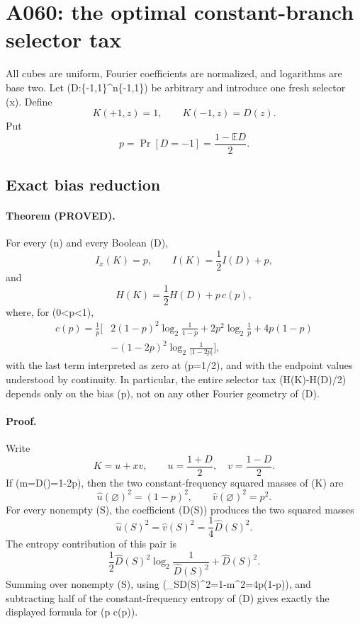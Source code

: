 \section*{A060: the optimal constant-branch selector tax}

All cubes are uniform, Fourier coefficients are normalized, and logarithms
are base two.  Let (D:\{-1,1\}^n\to\{-1,1\}) be arbitrary and introduce
one fresh selector (x).  Define
\[
 K(+1,z)=1,\qquad K(-1,z)=D(z).
\]
Put
\[
 p=\Pr[D=-1]=\frac{1-\mathbb ED}{2}.
\]

\subsection*{Exact bias reduction}

\paragraph{Theorem (PROVED).}
For every (n) and every Boolean (D),
\[
 I_x(K)=p,\qquad I(K)=\frac12I(D)+p,
\]
and
\[
 H(K)=\frac12H(D)+p\,c(p),
\]
where, for (0<p<1),
\begin{align*}
 c(p)=\frac1p\bigg[&
 2(1-p)^2\log_2\frac1{1-p}
 +2p^2\log_2\frac1p+4p(1-p)\\
 &-(1-2p)^2\log_2\frac1{|1-2p|}
 \bigg],
\end{align*}
with the last term interpreted as zero at (p=1/2), and with the endpoint
values understood by continuity.  In particular, the entire selector tax
(H(K)-H(D)/2) depends only on the bias (p), not on any other Fourier
geometry of (D).

\paragraph{Proof.}
Write
\[
 K=u+xv,\qquad u=\frac{1+D}{2},\quad v=\frac{1-D}{2}.
\]
If (m=\widehat D(\varnothing)=1-2p), then the two constant-frequency
squared masses of (K) are
\[
 \widehat u(\varnothing)^2=(1-p)^2,
 \qquad
 \widehat v(\varnothing)^2=p^2.
\]
For every nonempty (S\subseteq[n]), the coefficient
(\widehat D(S)) produces the two squared masses
\[
 \widehat u(S)^2=\widehat v(S)^2=\frac14\widehat D(S)^2.
\]
The entropy contribution of this pair is
\[
 \frac12\widehat D(S)^2
 \log_2\frac1{\widehat D(S)^2}
 +\widehat D(S)^2.
\]
Summing over nonempty (S), using
(\sum_{S\ne\varnothing}\widehat D(S)^2=1-m^2=4p(1-p)), and subtracting
half of the constant-frequency entropy of (D) gives exactly the displayed
formula for (p c(p)).


